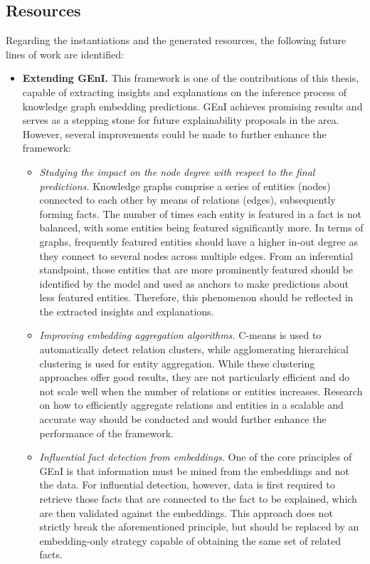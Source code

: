 

\subsection*{Resources}
Regarding the instantiations and the generated resources, the following future lines of work are identified:
\begin{itemize}
    \item \textbf{Extending GEnI.} This framework is one of the contributions of this thesis, capable of extracting insights and explanations on the inference process of knowledge graph embedding predictions. GEnI achieves promising results and serves as a stepping stone for future explainability proposals in the area. However, several improvements could be made to further enhance the framework:
    \begin{itemize}
        \item \textit{Studying the impact on the node degree with respect to the final predictions.} Knowledge graphs comprise a series of entities (nodes) connected to each other by means of relations (edges), subsequently forming facts. The number of times each entity is featured in a fact is not balanced, with some entities being featured significantly more. In terms of graphs, frequently featured entities should have a higher in-out degree as they connect to several nodes across multiple edges. From an inferential standpoint, those entities that are more prominently featured should be identified by the model and used as anchors to make predictions about less featured entities. Therefore, this phenomenon should be reflected in the extracted insights and explanations.
        \item \textit{Improving embedding aggregation algorithms.} C-means is used to automatically detect relation clusters, while agglomerating hierarchical clustering is used for entity aggregation. While these clustering approaches offer good results, they are not particularly efficient and do not scale well when the number of relations or entities increases. Research on how to efficiently aggregate relations and entities in a scalable and accurate way should be conducted and would further enhance the performance of the framework.
        \item \textit{Influential fact detection from embeddings.} One of the core principles of GEnI is that information must be mined from the embeddings and not the data. For influential detection, however, data is first required to retrieve those facts that are connected to the fact to be explained, which are then validated against the embeddings. This approach does not strictly break the aforementioned principle, but should be replaced by an embedding-only strategy capable of obtaining the same set of related facts. 

\end{itemize}
\end{itemize}
